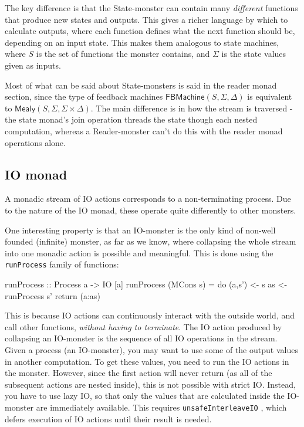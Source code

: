 \documentclass{article}
\begin{document}
The key difference is that the State-monster can contain many \emph{different} functions that produce new states and outputs. This gives a richer language by which to calculate outputs, where each function defines what the next function should be, depending on an input state. This makes them analogous to state machines, where $S$ is the set of functions the monster contains, and $\Sigma$ is the state values given as inputs.

Most of what can be said about State-monsters is said in the reader monad section, since the type of feedback machines $\mathsf{FBMachine}(S,\Sigma,\Delta)$ is equivalent to $\mathsf{Mealy}(S,\Sigma,\Sigma \times \Delta)$. The main difference is in how the stream is traversed - the state monad's join operation threads the state though each nested computation, whereas a Reader-monster can't do this with the reader monad operations alone.

\subsection{IO monad}

A monadic stream of IO actions corresponds to a non-terminating process. Due to the nature of the IO monad, these operate quite differently to other monsters.

One interesting property is that an IO-monster is the only kind of non-well founded (infinite) monster, as far as we know, where collapsing the whole stream into one monadic action is possible and meaningful. This is done using the \verb+runProcess+ family of functions:

\begin{haskell}
runProcess :: Process a -> IO [a]
runProcess (MCons s) = do (a,s') <- s
                          as     <- runProcess s'
                          return (a:as)
\end{haskell}

This is because IO actions can continuously interact with the outside world, and call other functions, \emph{without having to terminate}. The IO action produced by collapsing an IO-monster is the sequence of all IO operations in the stream. \\

Given a process (an IO-monster), you may want to use some of the output values in another computation. To get these values, you need to run the IO actions in the monster. However, since the first action will never return (as all of the subsequent actions are nested inside), this is not possible with strict IO. Instead, you have to use lazy IO, so that only the values that are calculated inside the IO-monster are immediately available. This requires \verb+unsafeInterleaveIO+ \cite{unsafe_io}, which defers execution of IO actions until their result is needed. 
\end{document}
